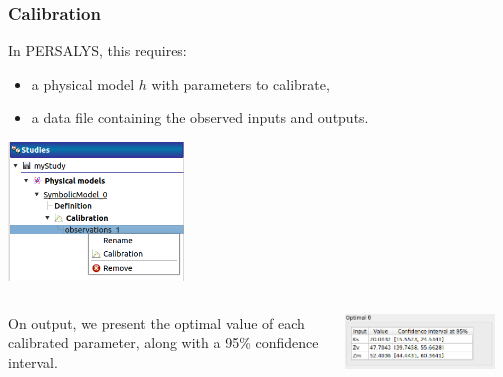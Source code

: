 \documentclass{beamer}
\begin{document}
\begin{frame}
\frametitle{Calibration}

In PERSALYS, this requires:
\begin{itemize}
\item a physical model $h$ with parameters to calibrate, 
\item a data file containing the observed inputs and outputs.
\end{itemize}

\begin{center}
\includegraphics[width=0.35\textwidth]{figures/calibration_observations_contextMenu.png}
\end{center}

\begin{columns}

On output, we present the optimal value of each calibrated parameter, 
along with a 95\% confidence interval.


\begin{center}
\includegraphics[width=0.9\textwidth]{figures/calibration-ks-zv-zm-optimal_focus.png}
\end{center}

\end{columns}
\end{frame}

\end{document}
